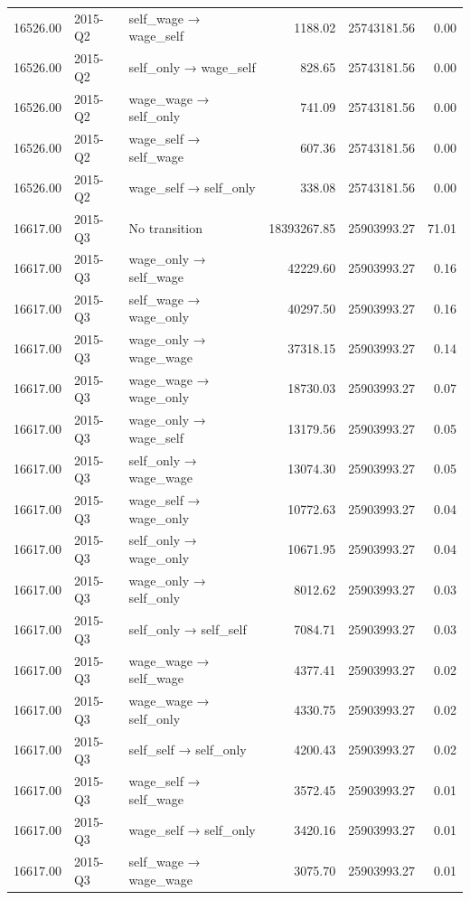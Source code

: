 \begin{table}[ht]
{\begin{tabular}{rllrrr}
  16526.00 & 2015-Q2 & self\_wage → wage\_self & 1188.02 & 25743181.56 & 0.00 \\ 
  16526.00 & 2015-Q2 & self\_only → wage\_self & 828.65 & 25743181.56 & 0.00 \\ 
  16526.00 & 2015-Q2 & wage\_wage → self\_only & 741.09 & 25743181.56 & 0.00 \\ 
  16526.00 & 2015-Q2 & wage\_self → self\_wage & 607.36 & 25743181.56 & 0.00 \\ 
  16526.00 & 2015-Q2 & wage\_self → self\_only & 338.08 & 25743181.56 & 0.00 \\ 
  16617.00 & 2015-Q3 & No transition & 18393267.85 & 25903993.27 & 71.01 \\ 
  16617.00 & 2015-Q3 & wage\_only → self\_wage & 42229.60 & 25903993.27 & 0.16 \\ 
  16617.00 & 2015-Q3 & self\_wage → wage\_only & 40297.50 & 25903993.27 & 0.16 \\ 
  16617.00 & 2015-Q3 & wage\_only → wage\_wage & 37318.15 & 25903993.27 & 0.14 \\ 
  16617.00 & 2015-Q3 & wage\_wage → wage\_only & 18730.03 & 25903993.27 & 0.07 \\ 
  16617.00 & 2015-Q3 & wage\_only → wage\_self & 13179.56 & 25903993.27 & 0.05 \\ 
  16617.00 & 2015-Q3 & self\_only → wage\_wage & 13074.30 & 25903993.27 & 0.05 \\ 
  16617.00 & 2015-Q3 & wage\_self → wage\_only & 10772.63 & 25903993.27 & 0.04 \\ 
  16617.00 & 2015-Q3 & self\_only → wage\_only & 10671.95 & 25903993.27 & 0.04 \\ 
  16617.00 & 2015-Q3 & wage\_only → self\_only & 8012.62 & 25903993.27 & 0.03 \\ 
  16617.00 & 2015-Q3 & self\_only → self\_self & 7084.71 & 25903993.27 & 0.03 \\ 
  16617.00 & 2015-Q3 & wage\_wage → self\_wage & 4377.41 & 25903993.27 & 0.02 \\ 
  16617.00 & 2015-Q3 & wage\_wage → self\_only & 4330.75 & 25903993.27 & 0.02 \\ 
  16617.00 & 2015-Q3 & self\_self → self\_only & 4200.43 & 25903993.27 & 0.02 \\ 
  16617.00 & 2015-Q3 & wage\_self → self\_wage & 3572.45 & 25903993.27 & 0.01 \\ 
  16617.00 & 2015-Q3 & wage\_self → self\_only & 3420.16 & 25903993.27 & 0.01 \\ 
  16617.00 & 2015-Q3 & self\_wage → wage\_wage & 3075.70 & 25903993.27 & 0.01 \\ 

\end{tabular}}
\end{table}
